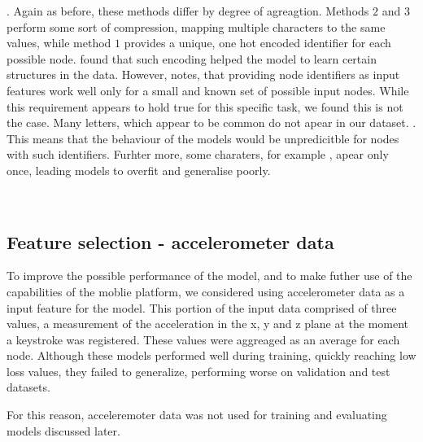 .
Again as before, these methods differ by degree of agreagtion. Methods $2$ and $3$ perform some sort of compression, mapping multiple characters to the same values, while method $1$ provides a unique, one hot encoded identifier for each possible node.  found that such encoding helped the model to learn certain structures in the data. However,  notes, that providing node identifiers as input features work well only for a small and known set of possible input nodes. While this requirement appears to hold true for this specific task, we found this is not the case. Many letters, which appear to be common do not apear in our dataset. . This means that the behaviour of the models would be unpredicitble for nodes with such identifiers.
Furhter more, some charaters, for example , apear only once, leading models to overfit and generalise poorly.



\\


\subsection{Feature selection - accelerometer data}
To improve the possible performance of the model, and to make futher use of the capabilities of the moblie platform, we considered using accelerometer data as a input feature for the model.
This portion of the input data comprised of three values, a measurement of the acceleration in the x, y and z plane at the moment a keystroke was registered. 
These values were aggreaged as an average for each node. Although these models performed well during training, quickly reaching low loss values, they failed to generalize, performing worse on 
validation and test datasets. 

For this reason, acceleremoter data was not used for training and evaluating models discussed later.


